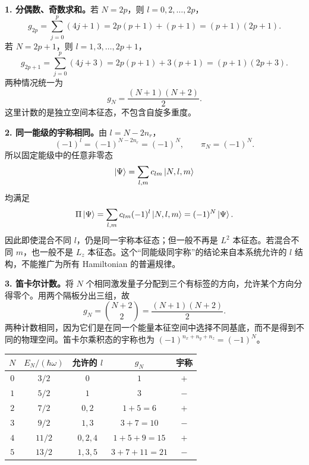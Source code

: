 \begin{checkedsolution}
\textbf{1. 分偶数、奇数求和。}若 $N=2p$，则 $l=0,2,\ldots,2p$，
\begin{equation}
  g_{2p}=\sum_{j=0}^p(4j+1)
    =2p(p+1)+(p+1)=(p+1)(2p+1).
\end{equation}
若 $N=2p+1$，则 $l=1,3,\ldots,2p+1$，
\begin{equation}
  g_{2p+1}=\sum_{j=0}^p(4j+3)
    =2p(p+1)+3(p+1)=(p+1)(2p+3).
\end{equation}
两种情况统一为
\begin{equation}
  \boxed{g_N=\frac{(N+1)(N+2)}2.}
\end{equation}
这里计数的是独立空间本征态，不包含自旋多重度。

\textbf{2. 同一能级的宇称相同。}由 $l=N-2n_r$，
\begin{equation}
  (-1)^l=(-1)^{N-2n_r}=(-1)^N,
  \qquad \boxed{\pi_N=(-1)^N.}
\end{equation}
所以固定能级中的任意非零态
\begin{equation}
  \left|\Psi\right\rangle=\sum_{l,m}c_{lm}\left|N,l,m\right\rangle
\end{equation}
均满足
\begin{equation}
  \Pi\left|\Psi\right\rangle=\sum_{l,m}c_{lm}(-1)^l\left|N,l,m\right\rangle
     =(-1)^N\left|\Psi\right\rangle.
\end{equation}
因此即使混合不同 $l$，仍是同一宇称本征态；但一般不再是 $L^2$ 本征态。若混合不同 $m$，也一般不是 $L_z$ 本征态。这个“同能级同宇称”的结论来自本系统允许的 $l$ 结构，不能推广为所有 Hamiltonian 的普遍规律。

\textbf{3. 笛卡尔计数。}将 $N$ 个相同激发量子分配到三个有标签的方向，允许某个方向分得零个。用两个隔板分出三组，故
\begin{equation}
  g_N=\binom{N+2}{2}=\boxed{\frac{(N+1)(N+2)}2}.
\end{equation}
两种计数相同，因为它们是在同一个能量本征空间中选择不同基底，而不是得到不同的物理空间。笛卡尔乘积态的宇称也为 $(-1)^{n_x+n_y+n_z}=(-1)^N$。

\begin{center}
\begin{tabular}{@{}ccccc@{}}
  \toprule
  $N$ & $E_N/(\hbar\omega)$ & 允许的 $l$ & $g_N$ & 宇称 \\
  \midrule
  $0$ & $3/2$ & $0$ & $1$ & $+$ \\
  $1$ & $5/2$ & $1$ & $3$ & $-$ \\
  $2$ & $7/2$ & $0,2$ & $1+5=6$ & $+$ \\
  $3$ & $9/2$ & $1,3$ & $3+7=10$ & $-$ \\
  $4$ & $11/2$ & $0,2,4$ & $1+5+9=15$ & $+$ \\
  $5$ & $13/2$ & $1,3,5$ & $3+7+11=21$ & $-$ \\
  \bottomrule
\end{tabular}
\end{center}
\end{checkedsolution}
